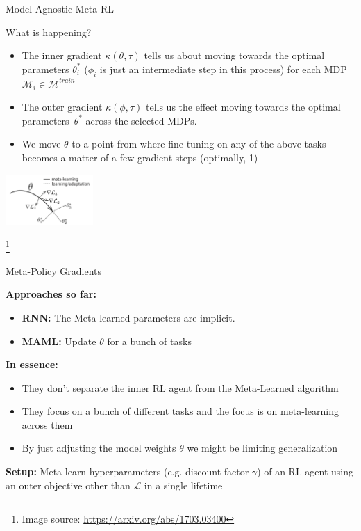 \documentclass[aspectratio=169]{../latex_main/tntbeamer}  %
\begin{document}
\begin{frame}{Model-Agnostic Meta-RL~}

    What is happening?
    \begin{itemize}
        \item The inner gradient $\kappa(\theta, \tau)$ tells us about moving towards the optimal parameters $\theta_i^*$ ($\phi_i$ is just an intermediate step in this process) for each MDP $\mathcal{M}_i \in \mathcal{M}^{train}$ 
        \item The outer gradient $\kappa(\phi, \tau)$ tells us the effect moving towards the optimal parameters~$\theta^*$ across the selected MDPs.
        \item We move $\theta$ to a point from where fine-tuning on any of the above tasks becomes a matter of a few gradient steps (optimally, 1)
    \end{itemize}

    \centering
    \includegraphics[width=0.25\textwidth]{images/t04/maml.png}

    \footnote{Image source: \url{https://arxiv.org/abs/1703.03400}}
    
\end{frame}


\begin{frame}{Meta-Policy Gradients~}
 
    \textbf{Approaches so far:} 
    \begin{itemize}
        \item \textbf{RNN:} The Meta-learned parameters are implicit.
        \item \textbf{MAML:} Update $\theta$ for a bunch of tasks
    \end{itemize}

    \vfill
    \textbf{In essence:}
    \begin{itemize}
        \item They don't separate the inner RL agent from the Meta-Learned algorithm
        \item They focus on a bunch of different tasks and the focus is on meta-learning across them
        \item By just adjusting the model weights $\theta$ we might be limiting generalization
    \end{itemize}

    \vfill
    \textbf{Setup:} Meta-learn hyperparameters (e.g. discount factor  $\gamma$) of an RL agent using an outer objective other than $\mathcal{L}$ in a single lifetime
  
\end{frame}
\end{document}

